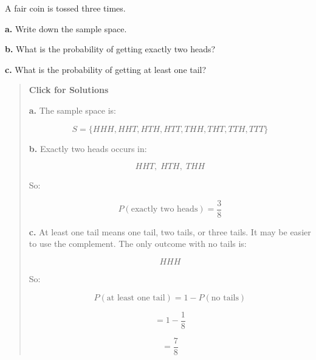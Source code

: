 \documentclass[
  letterpaper,
  DIV=11,
  numbers=noendperiod]{scrreprt}
\begin{document}
\begin{tcolorbox}[enhanced jigsaw, arc=.35mm, bottomrule=.15mm, bottomtitle=1mm, breakable, colback=white, colbacktitle=quarto-callout-note-color!10!white, colframe=quarto-callout-note-color-frame, coltitle=black, left=2mm, leftrule=.75mm, opacityback=0, opacitybacktitle=0.6, rightrule=.15mm, title=\textcolor{quarto-callout-note-color}{\faInfo}\hspace{0.5em}{Question 2}, titlerule=0mm, toprule=.15mm, toptitle=1mm]

A fair coin is tossed three times.

\textbf{a.} Write down the sample space.

\textbf{b.} What is the probability of getting exactly two heads?

\textbf{c.} What is the probability of getting at least one tail?

\begin{quote}
\textbf{Click for Solutions}

\textbf{a.} The sample space is:

\[
S = \{HHH,HHT,HTH,HTT,THH,THT,TTH,TTT\}
\]

\textbf{b.} Exactly two heads occurs in:

\[
HHT,\;HTH,\;THH
\]

So:

\[
P(\text{exactly two heads}) = \frac{3}{8}
\]

\textbf{c.} At least one tail means one tail, two tails, or three tails.
It may be easier to use the complement. The only outcome with no tails
is:

\[
HHH
\]

So:

\[
P(\text{at least one tail}) = 1 - P(\text{no tails})
\]

\[
= 1 - \frac{1}{8}
\]

\[
= \frac{7}{8}
\]
\end{quote}

\end{tcolorbox}
\end{document}
